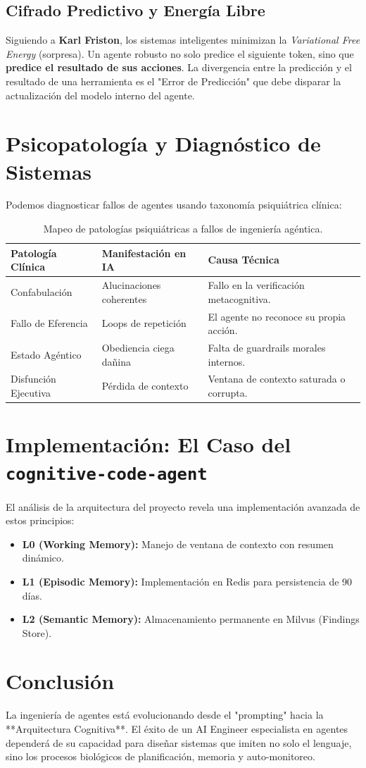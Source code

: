 \documentclass[11pt,a4paper,oneside]{article}
\begin{document}
\subsection{Cifrado Predictivo y Energía Libre}
Siguiendo a \textbf{Karl Friston}, los sistemas inteligentes minimizan la \textit{Variational Free Energy} (sorpresa). Un agente robusto no solo predice el siguiente token, sino que \textbf{predice el resultado de sus acciones}. La divergencia entre la predicción y el resultado de una herramienta es el "Error de Predicción" que debe disparar la actualización del modelo interno del agente.

\section{Psicopatología y Diagnóstico de Sistemas}
Podemos diagnosticar fallos de agentes usando taxonomía psiquiátrica clínica:

\begin{table}[h]
\centering
\begin{tabular}{@{}lll@{}}
\toprule
\textbf{Patología Clínica} & \textbf{Manifestación en IA} & \textbf{Causa Técnica} \\ \midrule
Confabulación & Alucinaciones coherentes & Fallo en la verificación metacognitiva. \\
Fallo de Eferencia & Loops de repetición & El agente no reconoce su propia acción. \\
Estado Agéntico & Obediencia ciega dañina & Falta de guardrails morales internos. \\
Disfunción Ejecutiva & Pérdida de contexto & Ventana de contexto saturada o corrupta. \\ \bottomrule
\end{tabular}
\caption{Mapeo de patologías psiquiátricas a fallos de ingeniería agéntica.}
\end{table}

\section{Implementación: El Caso del \texttt{cognitive-code-agent}}
El análisis de la arquitectura del proyecto revela una implementación avanzada de estos principios:
\begin{itemize}
    \item \textbf{L0 (Working Memory):} Manejo de ventana de contexto con resumen dinámico.
    \item \textbf{L1 (Episodic Memory):} Implementación en Redis para persistencia de 90 días.
    \item \textbf{L2 (Semantic Memory):} Almacenamiento permanente en Milvus (Findings Store).
\end{itemize}

\section{Conclusión}
La ingeniería de agentes está evolucionando desde el "prompting" hacia la **Arquitectura Cognitiva**. El éxito de un AI Engineer especialista en agentes dependerá de su capacidad para diseñar sistemas que imiten no solo el lenguaje, sino los procesos biológicos de planificación, memoria y auto-monitoreo.
\end{document}
